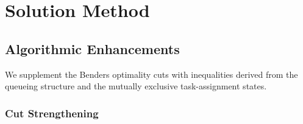 \documentclass[11pt]{article}
\begin{document}
\section{Solution Method}

\subsection{Algorithmic Enhancements}
\label{sec:strengthening}

We supplement the Benders optimality cuts with inequalities derived from the queueing structure and the mutually exclusive task-assignment states.

\subsubsection{Cut Strengthening}
\end{document}
